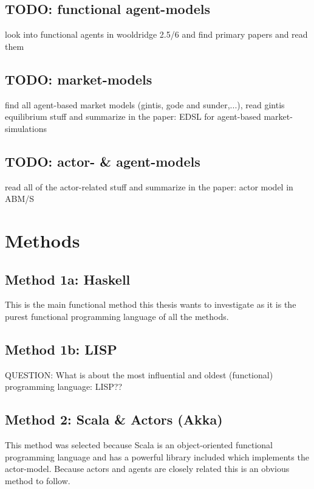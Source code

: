 \documentclass{article}
\begin{document}
\subsection{TODO: functional agent-models}
look into functional agents in wooldridge 2.5/6 and find primary papers and read them

\subsection{TODO: market-models}
find all agent-based market models (gintis, gode and sunder,...), read gintis equilibrium stuff and summarize in the paper: EDSL for agent-based market-simulations

\subsection{TODO: actor- \& agent-models}
read all of the actor-related stuff and summarize in the paper: actor model in ABM/S


\section{Methods}
\subsection{Method 1a: Haskell}
This is the main functional method this thesis wants to investigate as it is the purest functional programming language of all the methods.

\subsection{Method 1b: LISP}
QUESTION: What is about the most influential and oldest (functional) programming language: LISP??

\subsection{Method 2: Scala \& Actors (Akka)}
This method was selected because Scala is an object-oriented functional programming language and has a powerful library included which implements the actor-model. Because actors and agents are closely related this is an obvious method to follow.
\end{document}
